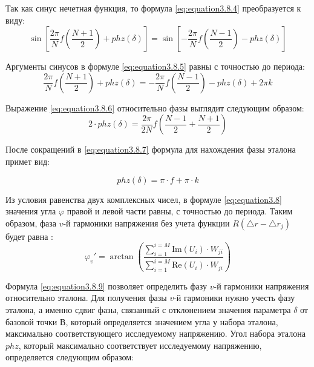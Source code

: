 Так как синус нечетная функция, то формула \ref{eq:equation3.8.4} преобразуется к виду:
\begin{equation}
	\label{eq:equation3.8.5}
\sin \left[{\frac{2 \pi}{N}f \left( \frac{N+1}{2} \right) + phz(\delta)} \right] =  \sin \left[ - {\frac{2 \pi}{N}f \left( \frac{N-1}{2}\right) - phz(\delta)  } \right] 	 
\end{equation}

Аргументы синусов в формуле \ref{eq:equation3.8.5} равны с точностью до периода:
\begin{equation}
	\label{eq:equation3.8.6}
	 {\frac{2 \pi}{N}f \left( \frac{N+1}{2} \right) + phz(\delta)  }  =   - {\frac{2 \pi}{N}f \left( \frac{N-1}{2}\right) - phz(\delta)} + 2 \pi k  	 
\end{equation}

Выражение \ref{eq:equation3.8.6} относительно фазы выглядит следующим образом:
\begin{equation}
\label{eq:equation3.8.7}
2 \cdot phz (\delta) = \frac{2 \pi}{2 N}f \left(\frac{N - 1}{2} + \frac{N + 1}{2} \right)  
\end{equation}

После сокращений в \ref{eq:equation3.8.7} формула для нахождения фазы эталона примет вид:

\begin{equation}
	\label{eq:equation3.8.8}
	 phz (\delta) = \pi \cdot f + \pi \cdot k  
\end{equation}

Из условия равенства двух комплексных чисел, в формуле \ref{eq:equation3.8} значения угла $\varphi$ правой и левой части равны, с точностью до периода. Таким образом, фаза  $v$-й гармоники напряжения без учета функции $R(\bigtriangleup r - \bigtriangleup r_j)$  будет равна \cite{Altman2012definition}:
\begin{equation}
\label{eq:equation3.8.9}
\varphi_{v}'= \arctan \left({\frac{\displaystyle\sum_{i=1}^{i=M} \mathrm{Im}(U_i) \cdot W_{ji}}{\displaystyle\sum_{i=1}^{i=M} \mathrm{Re}(U_i) \cdot W_{ji}}
}\right) 
\end{equation}

Формула \ref{eq:equation3.8.9} позволяет определить фазу  $v$-й гармоники напряжения относительно эталона. Для получения фазы  $v$-й гармоники нужно учесть фазу эталона, а именно сдвиг фазы, связанный с отклонением значения параметра $\delta$ от базовой точки $В$, который определяется значением угла у набора эталона, максимально соответствующего исследуемому напряжению. Угол набора эталона $phz$, который максимально соответствует исследуемому напряжению, определяется следующим образом:

